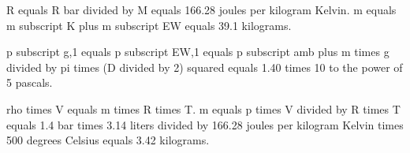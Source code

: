R equals R bar divided by M equals 166.28 joules per kilogram Kelvin.  
m equals m subscript K plus m subscript EW equals 39.1 kilograms.  

p subscript g,1 equals p subscript EW,1 equals p subscript amb plus m times g divided by pi times (D divided by 2) squared equals 1.40 times 10 to the power of 5 pascals.  

rho times V equals m times R times T.  
m equals p times V divided by R times T equals 1.4 bar times 3.14 liters divided by 166.28 joules per kilogram Kelvin times 500 degrees Celsius equals 3.42 kilograms.